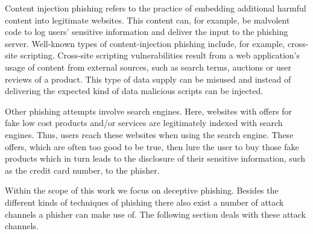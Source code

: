 \begin{description}[leftmargin=0cm]
	\item[Content Injection Phishing] Content injection phishing refers to the practice of embedding additional harmful content into legitimate websites. This content can, for example, be malvolent code to log users' sensitive information and deliver the input to the phishing server. Well-known types of content-injection phishing include, for example, cross-site scripting. Cross-site scripting vulnerabilities result from a web application's usage of content from external sources, such as search terms, auctions or user reviews of a product. This type of data supply can be misused and instead of delivering the expected kind of data malicious scripts can be injected.
	\item[Search Engine Phishing] Other phishing attempts involve search engines. Here, websites with offers for fake low cost products and/or services are legitimately indexed with search engines. Thus, users reach these websites when using the search engine. These offers, which are often too good to be true, then lure the user to buy those fake products which in turn leads to the disclosure of their sensitive information, such as the credit card number, to the phisher.

\end{description}
Within the scope of this work we focus on deceptive phishing. Besides the different kinds of techniques of phishing there also exist a number of attack channels a phisher can make use of. The following section deals with these attack channels.

